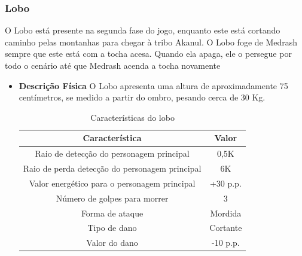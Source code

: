 \subsubsection{Lobo}
O Lobo está presente na segunda fase do jogo, enquanto este está cortando caminho pelas montanhas para chegar à tribo Akanul. O Lobo foge de Medrash sempre que este está com a tocha acesa. Quando ela apaga, ele o persegue por todo o cenário até que Medrash acenda a tocha novamente
\begin{itemize}
\item {\bf Descrição Física}
O Lobo apresenta uma altura de aproximadamente 75 centímetros, se medido a partir do ombro, pesando cerca de 30 Kg.
\begin{table}[H]
\begin{center}
\begin{tabular}{|c|c|}
\hline 
\textbf{Característica} & \textbf{Valor} \\ 
\hline 
Raio de detecção do personagem principal & 0,5K \\ 
\hline 
Raio de perda detecção do personagem principal & 6K \\ 
\hline 
Valor energético para o personagem principal & +30 p.p. \\ 
\hline 
Número de golpes para morrer & 3 \\ 
\hline 
Forma de ataque & Mordida \\ 
\hline 
Tipo de dano & Cortante \\ 
\hline 
Valor do dano & -10 p.p. \\ 
\hline 
\end{tabular} 
\end{center}
\caption{Características do lobo}
\label{table:lobo}
\end{table}
\end{itemize}
